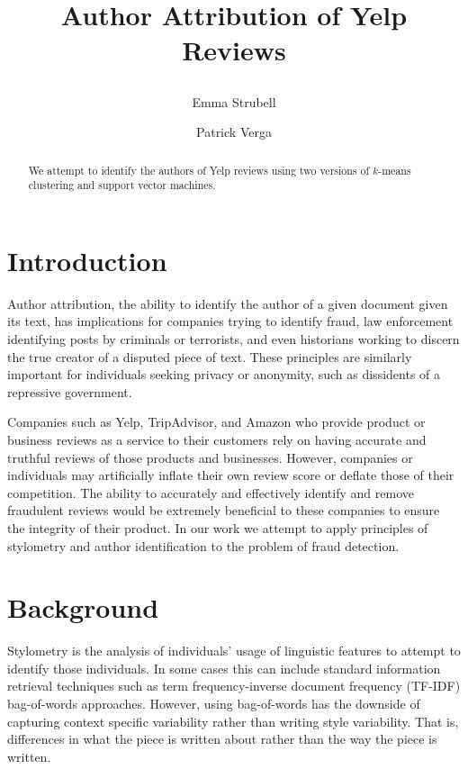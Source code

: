 \documentclass[12pt]{article}
\title{
\LARGE\bf Author Attribution of Yelp Reviews \\
\date{}
\author{ Emma Strubell \and Patrick Verga}
}
\begin{document}
\maketitle

\begin{abstract}
We attempt to identify the authors of Yelp reviews using two versions of $k$-means clustering and support vector machines.
\end{abstract}

\thispagestyle{fancy}


\section{Introduction}
Author attribution, the ability to identify the author of a given document given its text, has implications for companies trying to identify fraud, law enforcement identifying posts by criminals or terrorists, and even historians working to discern the true creator of a disputed piece of text. These principles are similarly important for individuals seeking privacy or anonymity, such as dissidents of a repressive government. 

Companies such as Yelp, TripAdvisor, and Amazon who provide product or business reviews as a service to their customers rely on having accurate and truthful reviews of those products and businesses. However, companies or individuals may artificially inflate their own review score or deflate those of their competition. The ability to accurately and effectively identify and remove fraudulent reviews would be extremely beneficial to these companies to ensure the integrity of their product. In our work we attempt to apply principles of stylometry and author identification to the problem of fraud detection. 

\section{Background}
Stylometry is the analysis of individuals’ usage of linguistic features to attempt to identify those individuals. In some cases this can include standard information retrieval techniques such as term frequency-inverse document frequency  (TF-IDF) bag-of-words approaches. However, using bag-of-words has the downside of capturing context specific variability rather than writing style variability. That is, differences in what the piece is written about rather than the way the piece is written.
\end{document}

